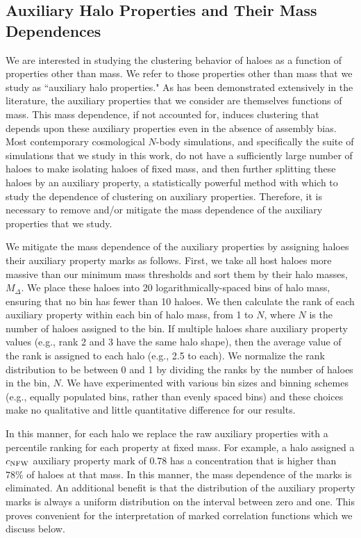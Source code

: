 \documentclass[usenatbib,fleqn]{mnras}
\begin{document}
\subsection{Auxiliary Halo Properties and Their Mass Dependences}
\label{subsection:properties}

We are interested in studying the clustering behavior of haloes as a function of properties other than mass. We refer to those properties other than mass that we study as ``auxiliary halo properties." As has been demonstrated extensively in the literature, the auxiliary properties that we consider are themselves functions of mass.
This mass dependence, if not accounted for, induces clustering that depends upon these auxiliary properties even in the absence of assembly bias. Most contemporary cosmological $N$-body simulations, and specifically the suite of simulations that we study in this work, do not have a sufficiently large number of haloes to make isolating haloes of fixed mass, and then further splitting these haloes by an auxiliary property, a statistically powerful method with which to study the dependence of clustering on auxiliary properties. Therefore, it is necessary to remove and/or mitigate the mass dependence of the auxiliary properties that we study. 

We mitigate the mass dependence of the auxiliary properties by assigning haloes their auxiliary property marks as follows. First, we take all host haloes more massive than our minimum mass thresholds and sort them by their halo masses, $M_{\Delta}$. We place these haloes into 20 logarithmically-spaced bins of halo mass, ensuring that no bin has fewer than 10 haloes. We then calculate the rank of each auxiliary property within each bin of halo mass, from 1 to $N$, where $N$ is the number of haloes assigned to the bin. If multiple haloes share auxiliary property values (e.g., rank 2 and 3 have the same halo shape), then the average value of the rank is assigned to each halo (e.g., 2.5 to each). We normalize the rank distribution to be between 0 and 1 by dividing the ranks by the number of haloes in the bin, $N$. We have experimented with various bin sizes and binning schemes (e.g., equally populated bins, rather than evenly spaced bins) and these choices make no qualitative and little quantitative difference for our results.

In this manner, for each halo we replace the raw auxiliary properties with a percentile ranking for each property at fixed mass. For example, a halo assigned a $c_{\rm NFW}$ auxiliary property mark of $0.78$ has a concentration that is higher than $78\%$ of haloes at that mass. In this manner, the mass dependence of the marks is eliminated. An additional benefit is that the distribution of the auxiliary property marks is always a uniform distribution on the interval between zero and one. This proves convenient for the interpretation of marked correlation functions which we discuss below.
\end{document}
